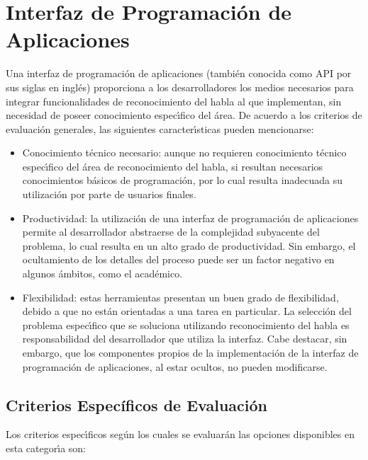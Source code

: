 \section{Interfaz de Programaci\'on de Aplicaciones}
\label{apis}


Una interfaz de programaci\'on de aplicaciones (tambi\'en conocida como API por sus siglas en ingl\'es)
proporciona a los desarrolladores los medios necesarios para integrar funcionalidades de
reconocimiento del habla al  que implementan, sin necesidad de poseer
conocimiento espec{\'\i}fico del \'area. De acuerdo a los criterios de evaluaci\'on generales, las
siguientes caracter{\'\i}sticas pueden mencionarse:

\begin{itemize}
 	\item Conocimiento t\'ecnico necesario: aunque no requieren conocimiento t\'ecnico espec{\'\i}fico
 	del \'area de reconocimiento del habla, si resultan necesarios conocimientos b\'asicos de
 	programaci\'on, por lo cual resulta inadecuada su utilizaci\'on por parte de usuarios finales.
 	\item Productividad: la utilizaci\'on de una interfaz de programaci\'on de aplicaciones permite
 	al desarrollador abstraerse de la complejidad subyacente del problema, lo cual resulta en
 	un alto grado de productividad. Sin embargo, el ocultamiento de los detalles del proceso
 	puede ser un factor negativo en algunos \'ambitos, como el acad\'emico.
 	\item Flexibilidad: estas herramientas presentan un buen grado de flexibilidad, debido a
 	que no est\'an orientadas a una tarea en particular. La selecci\'on del problema espec{\'\i}fico
 	que se soluciona utilizando reconocimiento del habla es responsabilidad del desarrollador
 	que utiliza la interfaz. Cabe destacar, sin embargo, que los componentes propios de la
 	implementaci\'on de la interfaz de programaci\'on de aplicaciones, al estar ocultos, no
 	pueden modificarse.
 \end{itemize}


\subsection{Criterios Espec\'ificos de Evaluaci\'on}

Los criterios espec{\'\i}ficos seg\'un los cuales se evaluar\'an las opciones disponibles en esta
categor{\'\i}a son:

